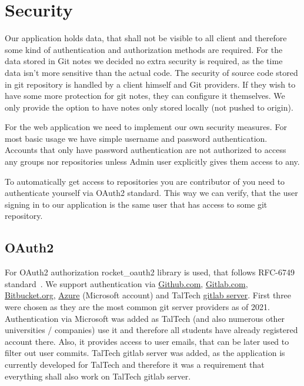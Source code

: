 \section{Security}\label{sec:scurity}
Our application holds data, that shall not be visible to all client and therefore some kind of authentication and authorization methods are required.
For the data stored in Git notes we decided no extra security is required, as the time data isn't more sensitive than the actual code.
The security of source code stored in git repository is handled by a client himself and Git providers.
If they wish to have some more protection for git notes, they can configure it themselves.
We only provide the option to have notes only stored locally (not pushed to origin).

For the web application we need to implement our own security measures.
For most basic usage we have simple username and password authentication.
Accounts that only have password authentication are not authorized to access any groups nor repositories unless Admin user
explicitly gives them access to any.

To automatically get access to repositories you are contributor of you need to authenticate yourself via OAuth2 standard.
This way we can verify, that the user signing in to our application is the same user that has access to some git repository.

\subsection{OAuth2}\label{subsec:oauth2}
For OAuth2 authorization rocket{\_}oauth2 library is used, that follows RFC-6749 standard~\cite{rocket-oauth2, oauth2}.
We support authentication via \href{https://github.com/}{Github.com}, \href{https://about.gitlab.com/}{Gitlab.com},
\href{https://bitbucket.org/}{Bitbucket.org}, \href{https://azure.microsoft.com/}{Azure} (Microsoft account) and
TalTech \href{https://gitlab.cs.ttu.ee/}{gitlab server}.
First three were chosen as they are the most common git server providers as of 2021.
Authentication via Microsoft was added as TalTech (and also numerous other universities / companies) use it and therefore
all students have already registered account there.
Also, it provides access to user emails, that can be later used to filter out user commits.
TalTech gitlab server was added, as the application is currently developed for TalTech and therefore it was a requirement
that everything shall also work on TalTech gitlab server.

